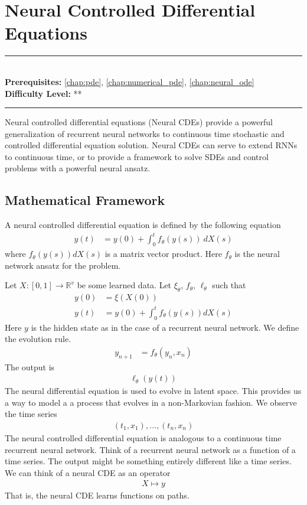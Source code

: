 \documentclass[book.tex]{subfiles}
\begin{document}
\chapter{Neural Controlled Differential Equations}
\label{chap:neural_cde}
\noindent\rule{11cm}{0.4pt} \\
\textbf{Prerequisites:}  \autoref{chap:pde}, \autoref{chap:numerical_pde}, \autoref{chap:neural_ode}  \\
\textbf{Difficulty Level:} ** \\
\noindent\rule{11cm}{0.4pt}
\vspace{5mm}

Neural controlled differential equations (Neural CDEs) provide a powerful generalization of recurrent neural networks to continuous time stochastic and controlled differential equation solution. Neural CDEs can serve to extend RNNs to continuous time, or to provide a framework to solve SDEs and control problems with a powerful neural ansatz.
\section{Mathematical Framework}
A neural controlled differential equation is defined by the following equation
\begin{align}
    y(t) &= y(0) + \int_0^t f_\theta(y(s))\ dX(s)
\end{align}
where $f_\theta(y(s)) dX(s)$ is a matrix vector product. Here $f_\theta$ is the neural network ansatz for the problem.

Let $X: [0, 1] \to \mathbb{R}^v$ be some learned data. Let $\xi_\theta$, $f_\theta$, $\ell_\theta$ such that
\begin{align}
    y(0) &= \xi(X(0)) \\
    y(t) &= y(0) + \int_0^t f_\theta(y(s))dX(s)
\end{align}
Here $y$ is the hidden state as in the case of a recurrent neural network. We define the evolution rule.
\begin{align}
    y_{n+1} &= f_\theta(y_n, x_n)
\end{align}
The output is
\begin{align}
    \ell_\theta(y(t))
\end{align}
The neural differential equation is used to evolve in latent space. This provides us a way to model a a process that evolves in a non-Markovian fashion. We observe the time series
\begin{align}
    (t_1, x_1),\dotsc,(t_n, x_n)
\end{align}
The neural controlled differential equation is analogous to a continuous time recurrent neural network. Think of a recurrent neural network as a function of a time series. The output might be something entirely different like a time series. We can think of a neural CDE as an operator
\begin{align}
    X \mapsto y
\end{align}
That is, the neural CDE learns functions on paths. %
\end{document}
